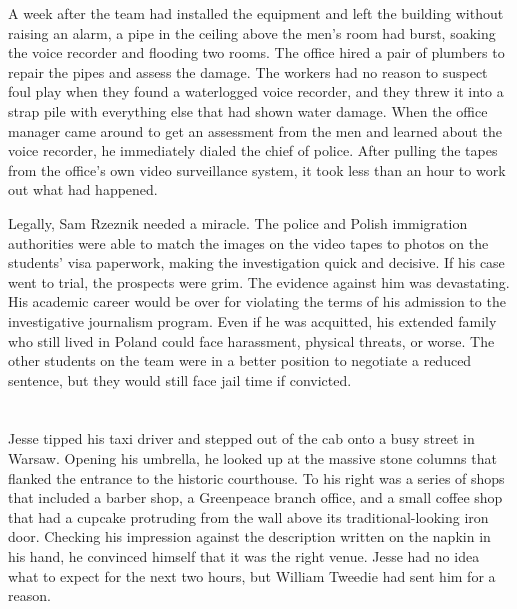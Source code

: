 \documentclass[12pt]{book}
\begin{document}
A week after the team had installed the equipment and left the building without raising an alarm, a pipe in the ceiling above the men's room had burst, soaking the voice recorder and flooding two rooms.  The office hired a pair of plumbers to repair the pipes and assess the damage.  The workers had no reason to suspect foul play when they found a waterlogged voice recorder, and they threw it into a strap pile with everything else that had shown water damage.  When the office manager came around to get an assessment from the men and learned about the voice recorder, he immediately dialed the chief of police.  After pulling the tapes from the office's own video surveillance system, it took less than an hour to work out what had happened.

Legally, Sam Rzeznik needed a miracle.  The police and Polish immigration authorities were able to match the images on the video tapes to photos on the students' visa paperwork, making the investigation quick and decisive.  If his case went to trial, the prospects were grim.  The evidence against him was devastating.  His academic career would be over for violating the terms of his admission to the investigative journalism program.  Even if he was acquitted, his extended family who still lived in Poland could face harassment, physical threats, or worse.  The other students on the team were in a better position to negotiate a reduced sentence, but they would still face jail time if convicted.

\chapter{}
									
Jesse tipped his taxi driver and stepped out of the cab onto a busy street in Warsaw.  Opening his umbrella, he looked up at the massive stone columns that flanked the entrance to the historic courthouse.  To his right was a series of shops that included a barber shop, a Greenpeace branch office, and a small coffee shop that had a cupcake protruding from the wall above its traditional-looking iron door.  Checking his impression against the description written on the napkin in his hand, he convinced himself that it was the right venue.  Jesse had no idea what to expect for the next two hours, but William Tweedie had sent him for a reason.
\end{document}
